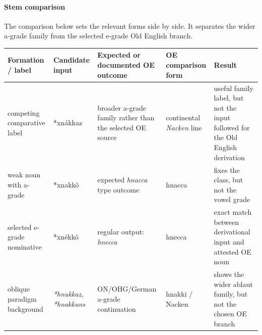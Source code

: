 \documentclass[
  british,
  a4paper,
]{article}
\newcounter{none} %
\begin{document}
\paragraph{Stem comparison}\label{stem-comparison-3}

The comparison below sets the relevant forms side by side. It separates
the wider a-grade family from the selected e-grade Old English branch.

{\def\LTcaptype{none} %
\begin{longtable}[]{@{}
  >{\raggedright\arraybackslash}p{}
  >{\raggedright\arraybackslash}p{}
  >{\raggedright\arraybackslash}p{}
  >{\raggedright\arraybackslash}p{}
  >{\raggedright\arraybackslash}p{}@{}}
\toprule\noalign{}
\begin{minipage}[b]{\linewidth}\raggedright
Formation / label
\end{minipage} & \begin{minipage}[b]{\linewidth}\raggedright
Candidate input
\end{minipage} & \begin{minipage}[b]{\linewidth}\raggedright
Expected or documented OE outcome
\end{minipage} & \begin{minipage}[b]{\linewidth}\raggedright
OE comparison form
\end{minipage} & \begin{minipage}[b]{\linewidth}\raggedright
Result
\end{minipage} \\
\midrule\noalign{}
\endhead
\bottomrule\noalign{}
\endlastfoot
competing comparative label & *xnákkaz & broader a-grade family rather
than the selected OE source & continental \emph{Nacken} line & useful
family label, but not the input followed for the Old English
derivation \\
weak noun with a-grade & *xnakkô & expected \emph{hnacca} type outcome &
hnacca & fixes the class, but not the vowel grade \\
selected e-grade nominative & *xnékkô & regular output: \emph{hnecca} &
hnecca & exact match between derivational input and attested OE noun \\
oblique paradigm background & \emph{*hnukkaz}, \emph{*hnakkuns} &
ON/OHG/German a-grade continuation & hnakki / Nacken & shows the wider
ablaut family, but not the chosen OE branch \\
\end{longtable}
}
\end{document}
